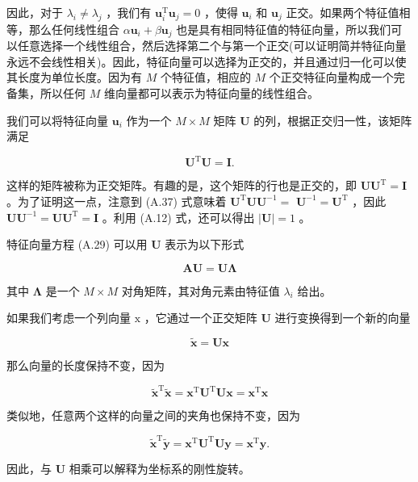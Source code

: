 \documentclass[10pt]{article}
\begin{document}
因此，对于 \({\lambda }_{i} \neq  {\lambda }_{j}\) ，我们有 \({\mathbf{u}}_{i}^{\mathrm{T}}{\mathbf{u}}_{j} = 0\) ，使得 \({\mathbf{u}}_{i}\) 和 \({\mathbf{u}}_{j}\) 正交。如果两个特征值相等，那么任何线性组合 \(\alpha {\mathbf{u}}_{i} + \beta {\mathbf{u}}_{j}\) 也是具有相同特征值的特征向量，所以我们可以任意选择一个线性组合，然后选择第二个与第一个正交(可以证明简并特征向量永远不会线性相关)。因此，特征向量可以选择为正交的，并且通过归一化可以使其长度为单位长度。因为有 \(M\) 个特征值，相应的 \(M\) 个正交特征向量构成一个完备集，所以任何 \(M\) 维向量都可以表示为特征向量的线性组合。

我们可以将特征向量 \({\mathbf{u}}_{i}\) 作为一个 \(M \times  M\) 矩阵 \(\mathbf{U}\) 的列，根据正交归一性，该矩阵满足

\[
{\mathbf{U}}^{\mathrm{T}}\mathbf{U} = \mathbf{I}. \tag{A.37}
\]

这样的矩阵被称为正交矩阵。有趣的是，这个矩阵的行也是正交的，即 \(\mathbf{U}{\mathbf{U}}^{\mathrm{T}} = \mathbf{I}\) 。为了证明这一点，注意到 (A.37) 式意味着 \({\mathbf{U}}^{\mathrm{T}}\mathbf{U}{\mathbf{U}}^{-1} =\)  \({\mathbf{U}}^{-1} = {\mathbf{U}}^{\mathrm{T}}\) ，因此 \(\mathbf{U}{\mathbf{U}}^{-1} = \mathbf{U}{\mathbf{U}}^{\mathrm{T}} = \mathbf{I}\) 。利用 (A.12) 式，还可以得出 \(\left| \mathbf{U}\right|  = 1\) 。

特征向量方程 (A.29) 可以用 \(\mathbf{U}\) 表示为以下形式

\[
\mathbf{{AU}} = \mathbf{{U\Lambda }} \tag{A.38}
\]

其中 \(\mathbf{\Lambda }\) 是一个 \(M \times  M\) 对角矩阵，其对角元素由特征值 \({\lambda }_{i}\) 给出。

如果我们考虑一个列向量 \(\mathrm{x}\) ，它通过一个正交矩阵 \(\mathbf{U}\) 进行变换得到一个新的向量

\[
\widetilde{\mathbf{x}} = \mathbf{{Ux}} \tag{A.39}
\]

那么向量的长度保持不变，因为

\[
{\widetilde{\mathbf{x}}}^{\mathrm{T}}\widetilde{\mathbf{x}} = {\mathbf{x}}^{\mathrm{T}}{\mathbf{U}}^{\mathrm{T}}\mathbf{U}\mathbf{x} = {\mathbf{x}}^{\mathrm{T}}\mathbf{x} \tag{A.40}
\]

类似地，任意两个这样的向量之间的夹角也保持不变，因为

\[
{\widetilde{\mathbf{x}}}^{\mathrm{T}}\widetilde{\mathbf{y}} = {\mathbf{x}}^{\mathrm{T}}{\mathbf{U}}^{\mathrm{T}}\mathbf{U}\mathbf{y} = {\mathbf{x}}^{\mathrm{T}}\mathbf{y}. \tag{A.41}
\]

因此，与 \(\mathbf{U}\) 相乘可以解释为坐标系的刚性旋转。
\end{document}
